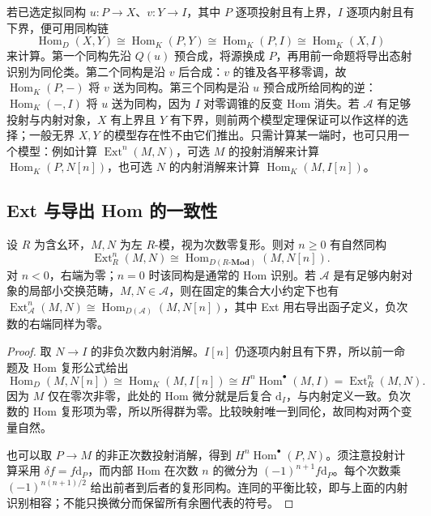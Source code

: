 若已选定拟同构 \(u:P\to X\)、\(v:Y\to I\)，其中 \(P\) 逐项投射且有上界，\(I\) 逐项内射且有下界，便可用同构链
\[
	\operatorname{Hom}_D(X,Y) \cong\operatorname{Hom}_K(P,Y) \cong\operatorname{Hom}_K(P,I) \cong\operatorname{Hom}_K(X,I)
\]
来计算。第一个同构先沿 \(Q(u)\) 预合成，将源换成 \(P\)，再用前一命题将导出态射识别为同伦类。第二个同构是沿 \(v\) 后合成：\(v\) 的锥及各平移零调，故 \(\operatorname{Hom}_K(P,-)\) 将 \(v\) 送为同构。第三个同构是沿 \(u\) 预合成所给同构的逆：\(\operatorname{Hom}_K(-,I)\) 将 \(u\) 送为同构，因为 \(I\) 对零调锥的反变 Hom 消失。若 \(\mathcal A\) 有足够投射与内射对象，\(X\) 有上界且 \(Y\) 有下界，则前两个模型定理保证可以作这样的选择；一般无界 \(X,Y\) 的模型存在性不由它们推出。只需计算某一端时，也可只用一个模型：例如计算 \(\operatorname{Ext}^n(M,N)\)，可选 \(M\) 的投射消解来计算 \(\operatorname{Hom}_K(P,N[n])\)，也可选 \(N\) 的内射消解来计算 \(\operatorname{Hom}_K(M,I[n])\)。

\subsection{Ext 与导出 Hom 的一致性}
\label{b4:subsec:1704:03}

\begin{theorem}\label{b4:thm:derived-ext-identification}
	设 \(R\) 为含幺环，\(M,N\) 为左 \(R\)-模，视为次数零复形。则对 \(n\ge0\) 有自然同构
	\[
		\operatorname{Ext}_R^n(M,N)\cong \operatorname{Hom}_{D(R\text{-}\mathbf{Mod})}(M,N[n]).
	\]
	对 \(n<0\)，右端为零；\(n=0\) 时该同构是通常的 Hom 识别。若 \(\mathcal A\) 是有足够内射对象的局部小交换范畴，\(M,N\in\mathcal A\)，则在固定的集合大小约定下也有 \(\operatorname{Ext}_{\mathcal A}^n(M,N)\cong\operatorname{Hom}_{D(\mathcal A)}(M,N[n])\)，其中 Ext 用右导出函子定义，负次数的右端同样为零。
\end{theorem}
\begin{proof}
	取 \(N\to I\) 的非负次数内射消解。\(I[n]\) 仍逐项内射且有下界，所以前一命题及 Hom 复形公式给出
	\[
		\operatorname{Hom}_D(M,N[n])\cong\operatorname{Hom}_K(M,I[n]) \cong H^n\operatorname{Hom}^{\bullet}(M,I) =\operatorname{Ext}^n_R(M,N).
	\]
	因为 \(M\) 仅在零次非零，此处的 Hom 微分就是后复合 \(\mathrm{d}_I\)，与内射定义一致。负次数的 Hom 复形项为零，所以所得群为零。比较映射唯一到同伦，故同构对两个变量自然。

	也可以取 \(P\to M\) 的非正次数投射消解，得到 \(H^n\operatorname{Hom}^{\bullet}(P,N)\)。须注意投射计算采用 \(\delta f=f\mathrm{d}_P\)，而内部 Hom 在次数 \(n\) 的微分为 \((-1)^{n+1}f\mathrm{d}_P\)。每个次数乘 \((-1)^{n(n+1)/2}\) 给出前者到后者的复形同构。连同的平衡比较，即与上面的内射识别相容；不能只换微分而保留所有余圈代表的符号。
\end{proof}

